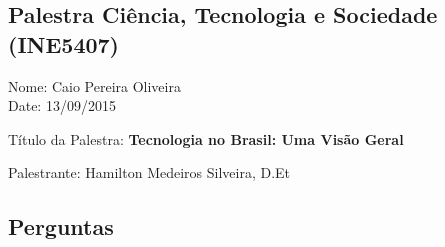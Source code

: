 \documentclass{article}
\begin{document}
\begin{center}
\section*{Palestra Ciência, Tecnologia e Sociedade (INE5407)}
\begin{center}
Nome: Caio Pereira Oliveira
\\Date: 13/09/2015
\end{center}
Título da Palestra: {\bf Tecnologia no Brasil: Uma Visão Geral}

Palestrante: Hamilton Medeiros Silveira, D.Et

\subsection*{Perguntas}

\end{center}
\end{document}

